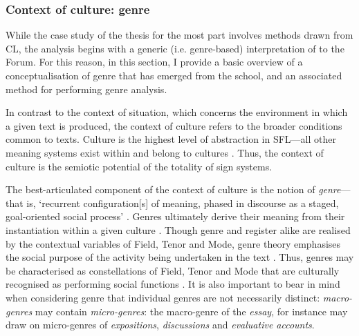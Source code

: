 


\subsubsection{Context of culture: genre} \label{sect:genre}

While the case study of the thesis for the most part involves methods drawn from \gls{CL}, the analysis begins with a generic (i.e. genre\hyp{}based) interpretation of  to the \gls{Forum}. For this reason, in this section, I provide a basic overview of a conceptualisation of genre that has emerged from the  school, and an associated method for performing genre analysis.



In contrast to the context of situation, which concerns the environment in which a given text is produced, the context of culture refers to the broader conditions common to texts. Culture is the highest level of abstraction in \gls{SFL}---all other meaning systems exist within and belong to cultures \cite{halliday_language_1989}. Thus, the context of culture is the semiotic potential of the totality of sign systems. 

The best\hyp{}articulated component of the context of culture is the notion of \emph{genre}---that is, `recurrent configuration[s] of meaning, phased in discourse as a staged, goal-oriented social process' \cite[p.~9]{martin_genre-based_2013}. Genres ultimately derive their meaning from their instantiation within a given culture \cite[p.~99]{halliday_language_1989}. Though genre and register alike are realised by the contextual variables of Field, Tenor and Mode, genre theory emphasises the social purpose of the activity being undertaken in the text \cite{christie_genre_2005,martin_english_1992}. Thus, genres may be characterised as constellations of Field, Tenor and Mode that are culturally recognised as performing social functions \cite{eggins_introduction_2004}. It is also important to bear in mind when considering genre that individual genres are not necessarily distinct: \emph{macro-genres} may contain \emph{micro-genres}: the macro-genre of the \emph{essay}, for instance may draw on micro-genres of \emph{expositions}, \emph{discussions} and \emph{evaluative accounts}.

